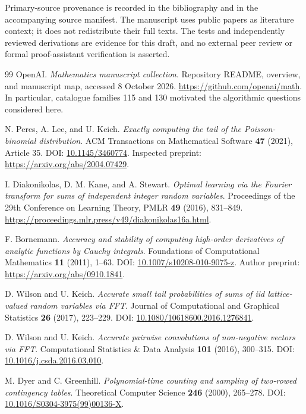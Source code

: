 \documentclass[11pt,a4paper]{article}
\theoremstyle{definition}
\begin{document}
Primary-source provenance is recorded in the bibliography and in the accompanying source manifest. The manuscript uses public papers as literature context; it does not redistribute their full texts. The tests and independently reviewed derivations are evidence for this draft, and no external peer review or formal proof-assistant verification is asserted.

\begin{thebibliography}{99}
 OpenAI. \emph{Mathematics manuscript collection}. Repository README, overview, and manuscript map, accessed 8 October 2026. \url{https://github.com/openai/math}. In particular, catalogue families 115 and 130 motivated the algorithmic questions considered here.

 N. Peres, A. Lee, and U. Keich. \emph{Exactly computing the tail of the Poisson-binomial distribution}. ACM Transactions on Mathematical Software \textbf{47} (2021), Article 35. DOI: \href{https://doi.org/10.1145/3460774}{10.1145/3460774}. Inspected preprint: \url{https://arxiv.org/abs/2004.07429}.

 I. Diakonikolas, D. M. Kane, and A. Stewart. \emph{Optimal learning via the Fourier transform for sums of independent integer random variables}. Proceedings of the 29th Conference on Learning Theory, PMLR \textbf{49} (2016), 831--849. \url{https://proceedings.mlr.press/v49/diakonikolas16a.html}.

 F. Bornemann. \emph{Accuracy and stability of computing high-order derivatives of analytic functions by Cauchy integrals}. Foundations of Computational Mathematics \textbf{11} (2011), 1--63. DOI: \href{https://doi.org/10.1007/s10208-010-9075-z}{10.1007/s10208-010-9075-z}. Author preprint: \url{https://arxiv.org/abs/0910.1841}.

 D. Wilson and U. Keich. \emph{Accurate small tail probabilities of sums of iid lattice-valued random variables via FFT}. Journal of Computational and Graphical Statistics \textbf{26} (2017), 223--229. DOI: \href{https://doi.org/10.1080/10618600.2016.1276841}{10.1080/10618600.2016.1276841}.

 D. Wilson and U. Keich. \emph{Accurate pairwise convolutions of non-negative vectors via FFT}. Computational Statistics \& Data Analysis \textbf{101} (2016), 300--315. DOI: \href{https://doi.org/10.1016/j.csda.2016.03.010}{10.1016/j.csda.2016.03.010}.

 M. Dyer and C. Greenhill. \emph{Polynomial-time counting and sampling of two-rowed contingency tables}. Theoretical Computer Science \textbf{246} (2000), 265--278. DOI: \href{https://doi.org/10.1016/S0304-3975(99)00136-X}{10.1016/S0304-3975(99)00136-X}.


\end{thebibliography}
\end{document}
